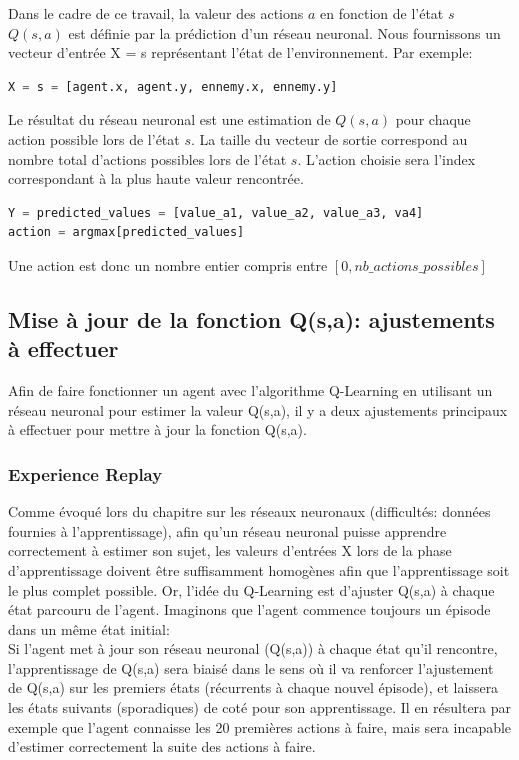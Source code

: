 \documentclass[11pt,a4paper]{report}
\begin{document}
   \par Dans le cadre de ce travail, la valeur des actions $a$ en fonction de l'état $s$ $Q(s,a)$ est définie par la prédiction d'un réseau neuronal. Nous fournissons un vecteur d'entrée X = s représentant l'état de l'environnement. Par exemple: 
   
  \begin{lstlisting}[language=python]
  X = s = [agent.x, agent.y, ennemy.x, ennemy.y]
  \end{lstlisting}
   
   \par Le résultat du réseau neuronal est une estimation de $Q(s,a)$ pour chaque action possible lors de l'état $s$. La taille du vecteur de sortie correspond au nombre total d'actions possibles lors de l'état $s$. L'action choisie sera l'index correspondant à la plus haute valeur rencontrée. 

  \begin{lstlisting}[language=python]
Y = predicted_values = [value_a1, value_a2, value_a3, va4]
action = argmax[predicted_values]
  \end{lstlisting}   
  
  \par Une action est donc un nombre entier compris entre $[0, nb\_actions\_possibles]$

  \subsection{Mise à jour de la fonction Q(s,a): ajustements à effectuer}
  
   \par Afin de faire fonctionner un agent avec l'algorithme Q-Learning en utilisant un réseau neuronal pour estimer la valeur Q(s,a), il y a deux ajustements principaux à effectuer pour mettre à jour la fonction Q(s,a). 
  
  \subsubsection{Experience Replay}
  
  \par Comme évoqué lors du chapitre sur les réseaux neuronaux (difficultés: données fournies à l'apprentissage), afin qu'un réseau neuronal puisse apprendre correctement à estimer son sujet, les valeurs d'entrées X lors de la phase d'apprentissage doivent être suffisamment homogènes afin que l'apprentissage soit le plus complet possible. Or, l'idée du Q-Learning est d'ajuster Q(s,a) à chaque état parcouru de l'agent. Imaginons que l'agent commence toujours un épisode dans un même état initial: \\
  Si l'agent met à jour son réseau neuronal (Q(s,a)) à chaque état qu'il rencontre, l'apprentissage de Q(s,a) sera biaisé dans le sens où il va renforcer l'ajustement de Q(s,a) sur les premiers états (récurrents à chaque nouvel épisode), et laissera les états suivants (sporadiques) de coté pour son apprentissage. Il en résultera par exemple que l'agent connaisse les 20 premières actions à faire, mais sera incapable d'estimer correctement la suite des actions à faire. 
  
\end{document}
